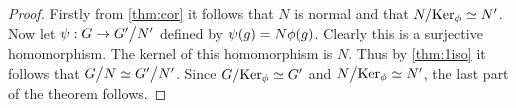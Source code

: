 \begin{proof}
  Firstly from \cref{thm:cor} it follows that $N$ is normal and that $N/\text{Ker}_\phi \simeq N'$. Now let $\psi: G\to G'\bign/N'$ defined by $\psi(g) = N\phi(g)$. Clearly this is a surjective homomorphism. The kernel of this homomorphism is $N$. Thus by \cref{thm:1iso} it follows that $G\bign/N \simeq G'\bign/N'$. Since $G/\text{Ker}_\phi \simeq G'$ and $N\bign/ \Ker_\p \simeq N'$, the last part of the theorem follows.
\end{proof}
